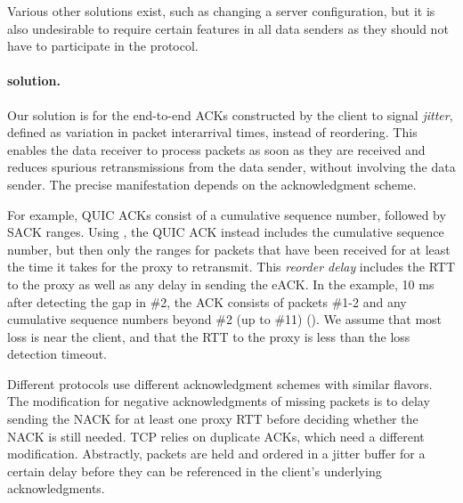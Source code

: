 Various other solutions exist, such as changing a server configuration, but it
is also undesirable to require certain features in all data senders as they
should not have to participate in the \Sys protocol.

\paragraph{\Sys solution.}

Our solution is for the end-to-end ACKs constructed by the client to
signal \textit{jitter}, defined as variation in packet interarrival times,
instead of reordering. This enables the data receiver to process packets as
soon as they are received and reduces spurious retransmissions from the data
sender, without involving the data sender. The precise manifestation depends on
the acknowledgment scheme.

For example, QUIC ACKs consist of a cumulative sequence number, followed by SACK
ranges. Using \Sys, the QUIC ACK instead includes the cumulative sequence
number, but then only the ranges for packets that have been received for at
least the time it takes for the proxy to retransmit. This
\textit{reorder delay} includes the RTT to the proxy
as well as any delay in sending the eACK.
In the example, 10 ms after detecting the gap in \#2, the ACK consists
of packets \#1-2 and any cumulative sequence numbers beyond \#2 (up to \#11)
().
We assume
that most loss is near the client, and that the RTT to the proxy is less than
the loss detection timeout.

Different protocols use different acknowledgment schemes with similar flavors.
The modification for negative acknowledgments of missing packets is to delay
sending the NACK for at least one proxy RTT before deciding whether the NACK is
still needed. TCP relies on duplicate ACKs, which need a different
modification. Abstractly, packets are held and ordered in a jitter buffer for a
certain delay before they can be referenced in the client's underlying
acknowledgments.


